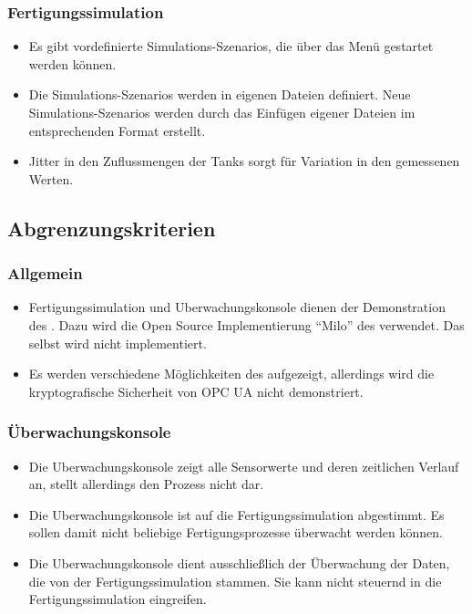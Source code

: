 \documentclass[parskip=full]{scrartcl}
\begin{document}
\subsubsection{Fertigungssimulation}
\begin{itemize}
  \item Es gibt vordefinierte \glspl{Simulations-Szenario}, die über das Menü gestartet werden können.
  \item Die \glspl{Simulations-Szenario} werden in eigenen Dateien definiert. Neue \glspl{Simulations-Szenario}
    werden durch das Einf\"ugen eigener Dateien im entsprechenden Format erstellt.
  \item \gls{Jitter} in den Zuflussmengen der Tanks sorgt f\"ur Variation in den gemessenen Werten.
\end{itemize}

\subsection{Abgrenzungskriterien}
\subsubsection{Allgemein}
\begin{itemize}
  \item \gls{Fertigungssimulation} und \gls{Uberwachungskonsole} dienen der Demonstration des . Dazu wird die Open Source
    Implementierung "`\gls{Milo}"' des  verwendet. Das  selbst wird nicht implementiert.
  \item Es werden verschiedene Möglichkeiten des  aufgezeigt, allerdings wird die kryptografische Sicherheit von \gls{OPC UA} nicht demonstriert.
\end{itemize}

\subsubsection{Überwachungskonsole}
\begin{itemize}
  \item Die \gls{Uberwachungskonsole} zeigt alle Sensorwerte und deren zeitlichen Verlauf an, stellt allerdings den Prozess nicht dar.
  \item Die \gls{Uberwachungskonsole} ist auf die \gls{Fertigungssimulation} abgestimmt. Es sollen damit nicht beliebige
    Fertigungsprozesse \"uberwacht werden k\"onnen.
  \item Die \gls{Uberwachungskonsole} dient ausschlie{\ss}lich der \"Uberwachung der Daten, die von der \gls{Fertigungssimulation}
    stammen. Sie kann nicht steuernd in die \gls{Fertigungssimulation} eingreifen.
\end{itemize}
\end{document}
